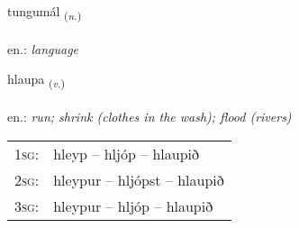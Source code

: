 \documentclass[frontgrid, backgrid]{flacards}\usepackage[]{graphicx}\usepackage[]{xcolor}
\begin{document}
\renewcommand{\flhead}{\vskip5pt \fboxsep=0pt {\small\bfseries\footnotesize Nafnorð | Noun}}
\renewcommand{\fcfoot}{\vskip5pt \fboxsep=0pt \hspace{2pt}{\small\bfseries\footnotesize 1K}}

\renewcommand{\blhead}{\vskip5pt {\small\bfseries\footnotesize Nafnorð | Noun }}
\renewcommand{\bcfoot}{\vskip5pt \hspace{2pt}{\small\bfseries\footnotesize 1K}}


{tungumál \small{\textsubscript{(\textit{n.})}} \\[1ex] %
\textphonetic{[tʰuŋkʏmaul]} \\
en.: \emph{language} \\  [2ex]
\renewcommand*{\arraystretch}{0.8}
}

\renewcommand{\flhead}{\vskip5pt \fboxsep=0pt {\small\bfseries\footnotesize Sagnorð | Verb}}
\renewcommand{\fcfoot}{\vskip5pt \fboxsep=0pt \hspace{2pt}{\small\bfseries\footnotesize 1K}}

\renewcommand{\blhead}{\vskip5pt {\small\bfseries\footnotesize Sagnorð | Verb }}
\renewcommand{\bcfoot}{\vskip5pt \hspace{2pt}{\small\bfseries\footnotesize 1K}}


{hlaupa \small{\textsubscript{(\textit{v.})}} \\[1ex] %
\textphonetic{[l̥œiːpa]} \\
en.: \emph{run; shrink (clothes in the wash); flood (rivers)} \\  [2ex]
\renewcommand*{\arraystretch}{0.8}
\begin{tabular}{p{1cm}l}
\textsc{1sg}: & hleyp -- hljóp -- hlaupið \\ 
\textsc{2sg}: & hleypur -- hljópst -- hlaupið \\ 
\textsc{3sg}: & hleypur -- hljóp -- hlaupið \\ 
\end{tabular}
}
\end{document}
